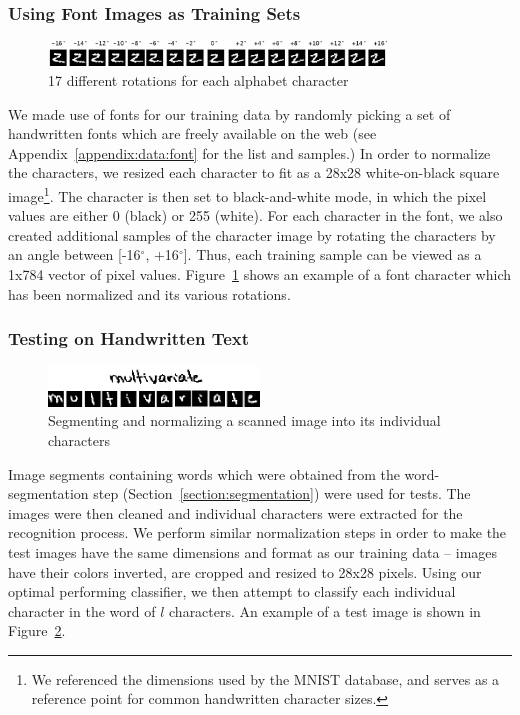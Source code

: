 \documentclass[12pt]{article}
\newcommand{\degree}{\ensuremath{^\circ}}
\begin{document}
		\subsubsection{Using Font Images as Training Sets}
		
		\begin{figure}[htbp!]
		\centering
		\includegraphics[width=0.8\textwidth]{training_data.eps}
		\caption{17 different rotations for each alphabet character}
		\label{figure:training_data}
		\end{figure}
		
		We made use of fonts for our training data by randomly picking a set of handwritten fonts which are freely available on the web (see Appendix~\ref{appendix:data:font} for the list and samples.) In order to normalize the characters, we resized each character to fit as a 28x28 white-on-black square image\footnote{We referenced the dimensions used by the MNIST database, and serves as a reference point for common handwritten character sizes.}. The character is then set to black-and-white mode, in which the pixel values are either 0 (black) or 255 (white). For each character in the font, we also created additional samples of the character image by rotating the characters by an angle between [-16\degree, +16\degree]. Thus, each training sample can be viewed as a 1x784 vector of pixel values. Figure~\ref{figure:training_data} shows an example of a font character which has been normalized and its various rotations.	
	
	\subsubsection{Testing on Handwritten Text}
		
		\begin{figure}[htbp!]
		\centering
		\includegraphics[width=0.5\textwidth]{multivariate_test.eps}
		\caption{Segmenting and normalizing a scanned image into its individual characters}
		\label{figure:multivariate_test}
		\end{figure}
		
		Image segments containing words which were obtained from the word-segmentation step (Section~\ref{section:segmentation}) were used for tests. The images were then cleaned and individual characters were extracted for the recognition process. We perform similar normalization steps in order to make the test images have the same dimensions and format as our training data -- images have their colors inverted, are cropped and resized to 28x28 pixels. Using our optimal performing classifier, we then attempt to classify each individual character in the word of $l$ characters. An example of a test image is shown in Figure~\ref{figure:multivariate_test}.
	
\end{document}
